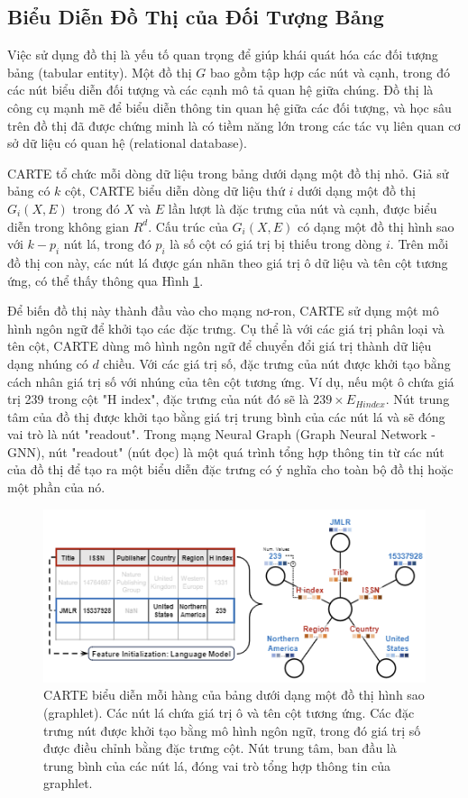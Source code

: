 \documentclass{article}
\begin{document}
\subsection{Biểu Diễn Đồ Thị của Đối Tượng Bảng} \label{sec:graph_representation}
Việc sử dụng đồ thị là yếu tố quan trọng để giúp khái quát hóa các đối tượng bảng (tabular entity). Một đồ thị $G$ bao gồm tập hợp các nút và cạnh, trong đó các nút biểu diễn đối tượng và các cạnh mô tả quan hệ giữa chúng. Đồ thị là công cụ mạnh mẽ để biểu diễn thông tin quan hệ giữa các đối tượng, và học sâu trên đồ thị đã được chứng minh là có tiềm năng lớn trong các tác vụ liên quan cơ sở dữ liệu có quan hệ (relational database).

CARTE tổ chức mỗi dòng dữ liệu trong bảng dưới dạng một đồ thị nhỏ. Giả sử bảng có $k$ cột, CARTE biểu diễn dòng dữ liệu thứ $i$ dưới dạng một đồ thị $G_i(X,E)$ trong đó $X$ và $E$ lần lượt là đặc trưng của nút và cạnh, được biểu diễn trong không gian $R^d$. Cấu trúc của $G_i(X,E)$ có dạng một đồ thị hình sao với $k-p_i$ nút lá, trong đó $p_i$ là số cột có giá trị bị thiếu trong dòng $i$. Trên mỗi đồ thị con này, các nút lá được gán nhãn theo giá trị ô dữ liệu và tên cột tương ứng, có thể thấy thông qua Hình \ref{fig:graphlet_representation_of_tabular_entity}.

Để biến đồ thị này thành đầu vào cho mạng nơ-ron, CARTE sử dụng một mô hình ngôn ngữ để khởi tạo các đặc trưng. Cụ thể là với các giá trị phân loại và tên cột, CARTE dùng mô hình ngôn ngữ để chuyển đổi giá trị thành dữ liệu dạng nhúng có $d$ chiều. Với các giá trị số, đặc trưng của nút được khởi tạo bằng cách nhân giá trị số với nhúng của tên cột tương ứng. Ví dụ, nếu một ô chứa giá trị 239 trong cột "H index", đặc trưng của nút đó sẽ là $239 \times E_{H index}$. Nút trung tâm của đồ thị được khởi tạo bằng giá trị trung bình của các nút lá và sẽ đóng vai trò là nút "readout". Trong mạng Neural Graph (Graph Neural Network - GNN), nút "readout" (nút đọc) là một quá trình tổng hợp thông tin từ các nút của đồ thị để tạo ra một biểu diễn đặc trưng có ý nghĩa cho toàn bộ đồ thị hoặc một phần của nó. 

\begin{figure} 
    \centering
    \includegraphics[scale = 1]{graphlet_representation_of_tabular_entity.png}
    \caption{CARTE biểu diễn mỗi hàng của bảng dưới dạng một đồ thị hình sao (graphlet). Các nút lá chứa giá trị ô và tên cột tương ứng. Các đặc trưng nút được khởi tạo bằng mô hình ngôn ngữ, trong đó giá trị số được điều chỉnh bằng đặc trưng cột. Nút trung tâm, ban đầu là trung bình của các nút lá, đóng vai trò tổng hợp thông tin của graphlet.}
    \label{fig:graphlet_representation_of_tabular_entity}
\end{figure}
\end{document}
